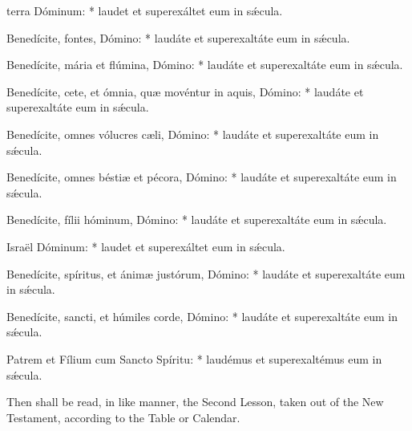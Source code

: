 { terra Dóminum: * laudet et superexáltet eum in sǽcula.\par
{}
Benedícite, fontes, Dómino: * laudáte et superexaltáte eum in sǽcula.\par
Benedícite, mária et flúmina, Dómino: * laudáte et superexaltáte eum in sǽcula.\par
Benedícite, cete, et ómnia, qu{\ae} movéntur in aquis, Dómino: * laudáte et superexaltáte eum in sǽcula.\par
Benedícite, omnes vólucres c{\ae}li, Dómino: * laudáte et superexaltáte eum in sǽcula.\par
Benedícite, omnes bésti{\ae} et pécora, Dómino: * laudáte et superexaltáte eum in sǽcula.\par
Benedícite, fílii hóminum, Dómino: * laudáte et superexaltáte eum in sǽcula.\par
{} Israël Dóminum: * laudet et superexáltet eum in sǽcula.\par
{}
Benedícite, spíritus, et ánim{\ae} justórum, Dómino: * laudáte et superexaltáte eum in sǽcula.\par
Benedícite, sancti, et húmiles corde, Dómino: * laudáte et superexaltáte eum in sǽcula.\par
{} Patrem et Fílium cum Sancto Spíritu: * laudémus et superexaltémus eum in sǽcula.}
\begin{rubric}
    {Then shall be read, in like manner, the Second Lesson, taken out of the New Testament, according to the Table or Calendar.}
\end{rubric}

